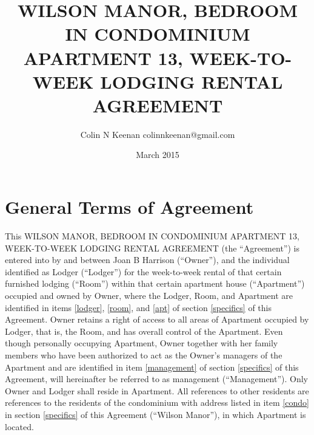 \documentclass[12pt,letterpaper]{article}
\newcommand{\agreementtitle}{WILSON MANOR, BEDROOM IN CONDOMINIUM APARTMENT 13, WEEK-TO-WEEK LODGING RENTAL AGREEMENT}
\newcommand{\lodger}{Lodger}
\newcommand{\generals}{General Terms of Agreement}
\newcommand{\mom}{Joan B Harrison}
\newcommand{\management}{Management}
\newcommand{\condo}{Wilson Manor}
\newcommand{\apt}{Apartment}
\newcommand{\room}{Room}
\begin{document}
\title{\agreementtitle{}}
\author{Colin N Keenan colinnkeenan@gmail.com}
\date{March 2015}
\maketitle
\thispagestyle{fancy}

\noindent \hrulefill
\section{\generals{}} \label{generals}
This \agreementtitle{} (the ``Agreement'') is entered into by and between \mom{} (``Owner''), and the individual identified as \lodger{} (``\lodger{}'') for the week-to-week rental of that certain furnished lodging (``\room{}'') within that certain apartment house (``\apt{}'') occupied and owned by Owner, where the \lodger{}, \room{}, and \apt{} are identified in items \ref{lodger}, \ref{room}, and \ref{apt} of section \ref{specifics} of this Agreement. Owner retains a right of access to all areas of \apt{} occupied by \lodger{}, that is, the \room{}, and has overall control of the \apt{}. Even though personally occupying \apt{}, Owner together with her family members who have been authorized to act as the Owner's managers of the \apt{} and are identified in item \ref{management} of section \ref{specifics} of this Agreement, will hereinafter be referred to as management (``\management{}''). Only Owner and \lodger{} shall reside in \apt{}. All references to other residents are references to the residents of the condominium with address listed in item \ref{condo} in section \ref{specifics} of this Agreement (``\condo{}''), in which \apt{} is located.
\end{document}
